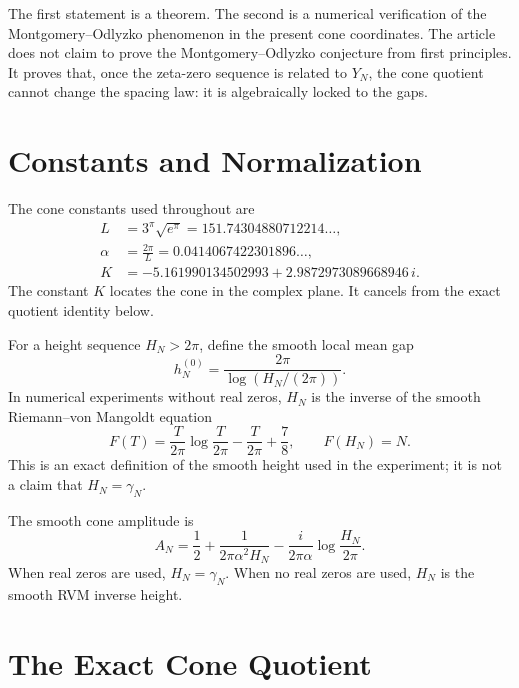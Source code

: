 \documentclass[11pt]{amsart}
\numberwithin{equation}{section}
\theoremstyle{plain}
\theoremstyle{definition}
\theoremstyle{remark}
\begin{document}
The first statement is a theorem. The second is a numerical verification of the Montgomery--Odlyzko phenomenon in the present cone coordinates. The article does not claim to prove the Montgomery--Odlyzko conjecture from first principles. It proves that, once the zeta-zero sequence is related to $Y_N$, the cone quotient cannot change the spacing law: it is algebraically locked to the gaps.

\section{Constants and Normalization}
\label{sec:constants}

The cone constants used throughout are
\begin{align}
L&=3^{\pi}\sqrt{e^{\pi}}=151.74304880712214\ldots,
\label{eq:cone_length}\\
\alpha&=\frac{2\pi}{L}=0.0414067422301896\ldots,
\label{eq:alpha}\\
K&=-5.161990134502993+2.9872973089668946\,i.
\label{eq:cone_center}
\end{align}
The constant $K$ locates the cone in the complex plane. It cancels from the exact quotient identity below.

For a height sequence $H_N>2\pi$, define the smooth local mean gap
\begin{equation}
h_N^{(0)}=\frac{2\pi}{\log(H_N/(2\pi))}.
\label{eq:mean_gap}
\end{equation}
In numerical experiments without real zeros, $H_N$ is the inverse of the smooth Riemann--von Mangoldt equation
\begin{equation}
F(T)=\frac{T}{2\pi}\log\frac{T}{2\pi}-\frac{T}{2\pi}+\frac{7}{8},
\qquad
F(H_N)=N.
\label{eq:rvm_inverse}
\end{equation}
This is an exact definition of the smooth height used in the experiment; it is not a claim that $H_N=\gamma_N$.

The smooth cone amplitude is
\begin{equation}
A_N=\frac12+\frac{1}{2\pi\alpha^2H_N}-\frac{i}{2\pi\alpha}\log\frac{H_N}{2\pi}.
\label{eq:smooth_cone_amplitude}
\end{equation}
When real zeros are used, $H_N=\gamma_N$. When no real zeros are used, $H_N$ is the smooth RVM inverse height.

\section{The Exact Cone Quotient}
\label{sec:exact_quotient}
\end{document}
